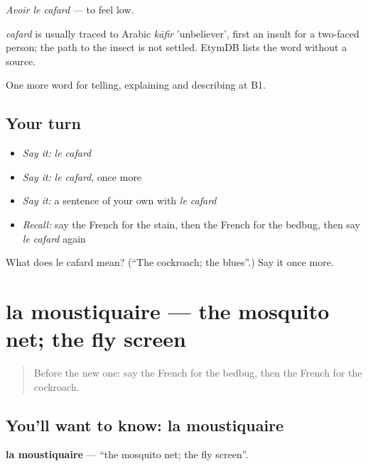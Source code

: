 \emph{Avoir le cafard} — to feel low.

\begin{cousinweb}
\emph{cafard} is usually traced to Arabic \emph{kāfir} 'unbeliever', first an insult for a two-faced person; the path to the insect is not settled. EtymDB lists the word without a source.
\end{cousinweb}

\begin{grammarlens}[title={What you've built}]
One more word for telling, explaining and describing at B1.
\end{grammarlens}

\subsection*{Your turn}
\begin{itemize}
\raggedright
  \item \emph{Say it:} \emph{le cafard}
  \item \emph{Say it:} \emph{le cafard}, once more
  \item \emph{Say it:} a sentence of your own with \emph{le cafard}
  \item \emph{Recall:} say the French for the stain, then the French for the bedbug, then say \emph{le cafard} again
\end{itemize}

\begin{tcolorbox}[breakable,colback=teal!4,colframe=teal!35!black,title={Before you move on}]
What does le cafard mean? (\textquotedblleft{}The cockroach; the blues\textquotedblright{}.) Say it once more.
\end{tcolorbox}
\section[la moustiquaire]{la moustiquaire — the mosquito net; the fly screen}

\label{lesson:FR-C430-moustiquaire}



\begin{quote}
Before the new one: say the French for the bedbug, then the French for the cockroach.
\end{quote}

\subsection*{You'll want to know: la moustiquaire}
\textbf{la moustiquaire} — \textquotedblleft{}the mosquito net; the fly screen\textquotedblright{}.

